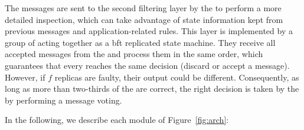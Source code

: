 The messages are sent to the second filtering layer by the \presieve to perform a more detailed inspection, which can take advantage of state information kept from previous messages and application-related rules.
This layer is implemented by a group of \repsieves acting together as a \gls{bft} replicated state machine.
They receive all accepted messages from the \presieves and process them in the same order, which guarantees that every \repsieve reaches the same decision (discard or accept a message).
However, if $f$ replicas are faulty, their output could be different.
Consequently, as long as more than two-thirds of the \repsieves are correct, the right decision is taken by the \postsieve by performing a message voting.

In the following, we describe each module of Figure~\ref{fig:arch}:


